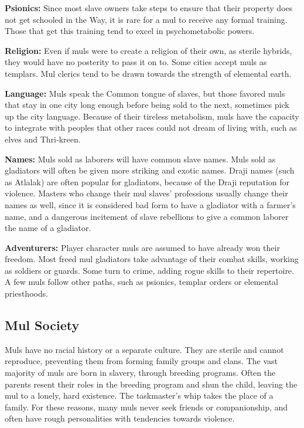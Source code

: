 \textbf{Psionics:} Since most slave owners take steps to ensure that their property does not get schooled in the Way, it is rare for a mul to receive any formal training. Those that get this training tend to excel in psychometabolic powers.

\textbf{Religion:} Even if muls were to create a religion of their own, as sterile hybrids, they would have no posterity to pass it on to. Some cities accept muls as templars. Mul clerics tend to be drawn towards the strength of elemental earth.

\textbf{Language:} Muls speak the Common tongue of slaves, but those favored muls that stay in one city long enough before being sold to the next, sometimes pick up the city language. Because of their tireless metabolism, muls have the capacity to integrate with peoples that other races could not dream of living with, such as elves and Thri‐kreen.

\textbf{Names:} Muls sold as laborers will have common slave names. Muls sold as gladiators will often be given more striking and exotic names. Draji names (such as Atlalak) are often popular for gladiators, because of the Draji reputation for violence. Masters who change their mul slaves' professions usually change their names as well, since it is considered bad form to have a gladiator with a farmer's name, and a dangerous incitement of slave rebellions to give a common laborer the name of a gladiator.

\textbf{Adventurers:} Player character muls are assumed to have already won their freedom. Most freed mul gladiators take advantage of their combat skills, working as soldiers or guards. Some turn to crime, adding rogue skills to their repertoire. A few muls follow other paths, such as psionics, templar orders or elemental priesthoods.

\subsection{Mul Society}
Muls have no racial history or a separate culture. They are sterile and cannot reproduce, preventing them from forming family groups and clans. The vast majority of muls are born in slavery, through breeding programs. Often the parents resent their roles in the breeding program and shun the child, leaving the mul to a lonely, hard existence. The taskmaster's whip takes the place of a family. For these reasons, many muls never seek friends or companionship, and often have rough personalities with tendencies towards violence.


